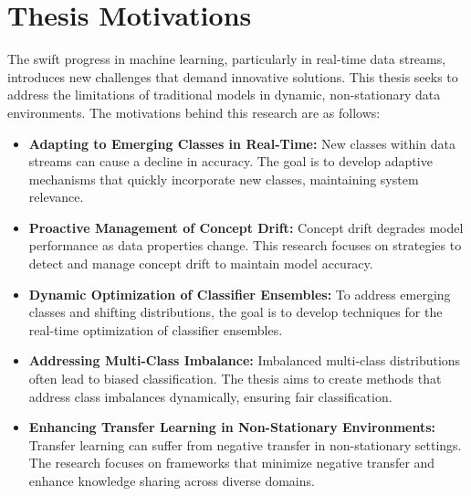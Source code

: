
\section{Thesis Motivations}
\label{sec:1_introduction_motivation}

The swift progress in machine learning, particularly in real-time data streams, introduces new challenges that demand innovative solutions. This thesis seeks to address the limitations of traditional models in dynamic, non-stationary data environments. The motivations behind this research are as follows:
\begin{itemize}
    \setlength{\itemsep}{0pt}
    \setlength{\parskip}{0pt}
    \item \textbf{Adapting to Emerging Classes in Real-Time:} New classes within data streams can cause a decline in accuracy. The goal is to develop adaptive mechanisms that quickly incorporate new classes, maintaining system relevance.
    \item \textbf{Proactive Management of Concept Drift:} Concept drift degrades model performance as data properties change. This research focuses on strategies to detect and manage concept drift to maintain model accuracy.
    \item \textbf{Dynamic Optimization of Classifier Ensembles:} To address emerging classes and shifting distributions, the goal is to develop techniques for the real-time optimization of classifier ensembles.
    \item \textbf{Addressing Multi-Class Imbalance:} Imbalanced multi-class distributions often lead to biased classification. The thesis aims to create methods that address class imbalances dynamically, ensuring fair classification.
    \item \textbf{Enhancing Transfer Learning in Non-Stationary Environments:} Transfer learning can suffer from negative transfer in non-stationary settings. The research focuses on frameworks that minimize negative transfer and enhance knowledge sharing across diverse domains.
\end{itemize}
